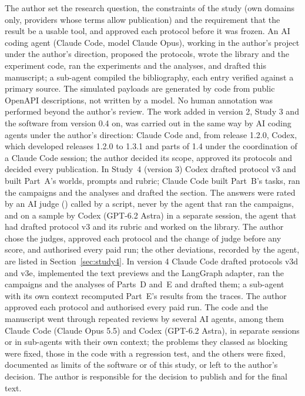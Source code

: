The author set the research question, the constraints of the study (own domains only, providers whose terms allow
publication) and the requirement that the result be a usable tool, and approved each protocol
before it was frozen. An AI coding agent (Claude Code, model Claude Opus), working in the author's project under the
author's direction, proposed the protocols, wrote the library and the experiment code, ran the experiments and the
analyses, and drafted this manuscript; a sub-agent compiled the bibliography, each entry verified against a primary
source. The simulated payloads are generated by code from public OpenAPI descriptions, not written by a model. No
human annotation was performed beyond the author's review. The work added in version 2, Study 3 and the software
from version 0.4 on, was carried out in the same way by AI coding agents under the author's direction: Claude Code
and, from release 1.2.0, Codex, which developed releases 1.2.0 to 1.3.1 and parts of 1.4 under the coordination of
a Claude Code session; the author decided its scope, approved its protocols and decided every publication.
In Study~4 (version 3) Codex drafted protocol v3 and built Part~A's worlds, prompts and rubric; Claude Code built
Part~B's tasks, ran the campaigns and the analyses and drafted the section. The answers were rated by an AI judge
(\texttt{\SfourJudge}) called by a script, never by the agent that ran the campaigns, and on a sample by Codex
(GPT-6.2 Astra) in a separate session, the agent that had drafted protocol v3 and its rubric and worked on the
library. The author chose the judges, approved each protocol and the change of judge before any score, and
authorised every paid run; the other deviations, recorded by the agent, are listed in Section~\ref{sec:study4}.
In version 4 Claude Code drafted protocols v3d and v3e, implemented the text previews and the LangGraph adapter,
ran the campaigns and the analyses of Parts~D and~E and drafted them; a sub-agent with its own context recomputed
Part~E's results from the traces. The author approved each protocol and authorised every paid run.
The code and the manuscript went through repeated reviews by several AI agents, among them Claude Code (Claude Opus
5.5) and Codex (GPT-6.2 Astra), in separate sessions or in sub-agents with their own context; the problems they
classed as blocking were fixed, those in the code with a regression test, and the others were fixed, documented as
limits of the software or of this study, or left to the author's decision. The author is responsible for the
decision to publish and for the final text.
